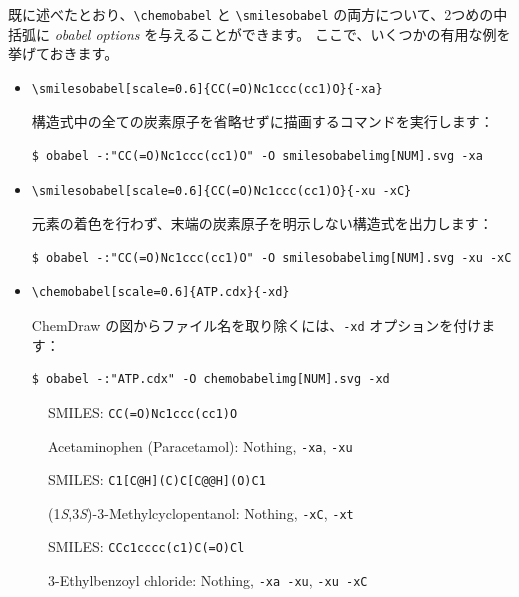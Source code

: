 \documentclass[12pt]{jsarticle}
\begin{document}
既に述べたとおり、\verb|\chemobabel| と \verb|\smilesobabel| の両方について、2つめの中括弧に \textit{obabel options} を与えることができます。
ここで、いくつかの有用な例を挙げておきます。
\begin{itemize}
\item
\begin{verbatim}
\smilesobabel[scale=0.6]{CC(=O)Nc1ccc(cc1)O}{-xa}
\end{verbatim}
構造式中の全ての炭素原子を省略せずに描画するコマンドを実行します：
\begin{verbatim}
$ obabel -:"CC(=O)Nc1ccc(cc1)O" -O smilesobabelimg[NUM].svg -xa
\end{verbatim}
\item
\begin{verbatim}
\smilesobabel[scale=0.6]{CC(=O)Nc1ccc(cc1)O}{-xu -xC}
\end{verbatim}
元素の着色を行わず、末端の炭素原子を明示しない構造式を出力します：
\begin{verbatim}
$ obabel -:"CC(=O)Nc1ccc(cc1)O" -O smilesobabelimg[NUM].svg -xu -xC
\end{verbatim}
\item
\begin{verbatim}
\chemobabel[scale=0.6]{ATP.cdx}{-xd}
\end{verbatim}
ChemDraw の図からファイル名を取り除くには、\texttt{-xd} オプションを付けます：
\begin{verbatim}
$ obabel -:"ATP.cdx" -O chemobabelimg[NUM].svg -xd
\end{verbatim}
\end{itemize}

\begin{figure}[ht]
  \centering
  \caption{Acetaminophen (Paracetamol): Nothing, \texttt{-xa}, \texttt{-xu}}
  SMILES: \verb|CC(=O)Nc1ccc(cc1)O|
\end{figure}

\begin{figure}[ht]
  \centering
  \caption{(1\textit{S},3\textit{S})-3-Methylcyclopentanol: Nothing, \texttt{-xC}, \texttt{-xt}}
  SMILES: \verb|C1[C@H](C)C[C@@H](O)C1|
\end{figure}

\begin{figure}[ht]
  \centering
  \caption{3-Ethylbenzoyl chloride: Nothing, \texttt{-xa -xu}, \texttt{-xu -xC}}
  SMILES: \verb|CCc1cccc(c1)C(=O)Cl|
\end{figure}
\end{document}
